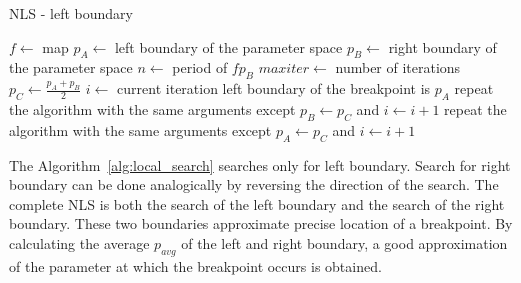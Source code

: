 \begin{algorithm}[!h]
    \caption{NLS - left boundary}
    \label{alg:local_search}
    \begin{algorithmic}[1]
        \Statex $f \gets$ map
        \Statex $p_{A} \gets$ left boundary of the parameter space
        \Statex $p_{B} \gets$ right boundary of the parameter space
        \Statex $n \gets$ period of $f{p_{B}}$
        \Statex $maxiter \gets$ number of iterations
        \State $p_{C} \gets \frac{p_{A}+p_{B}}{2}$
        \State $i \gets$ current iteration
            \State left boundary of the breakpoint is $p_{A}$
        \EndIf
            \State repeat the algorithm with the same arguments except $p_{B} \gets p_{C}$ and $i \gets i+1$
        \Else
            \State repeat the algorithm with the same arguments except $p_{A} \gets p_{C}$ and $i \gets i+1$
        \EndIf
    \end{algorithmic}
\end{algorithm}

\par
The Algorithm~\ref{alg:local_search} searches only for left boundary. Search for right boundary can be done analogically by reversing the direction of the search.
The complete NLS is both the search of the left boundary and the search of the right boundary.
These two boundaries approximate precise location of a breakpoint.
By calculating the average $p_{avg}$ of the left and right boundary, a good approximation of the parameter at which the breakpoint occurs is obtained.

